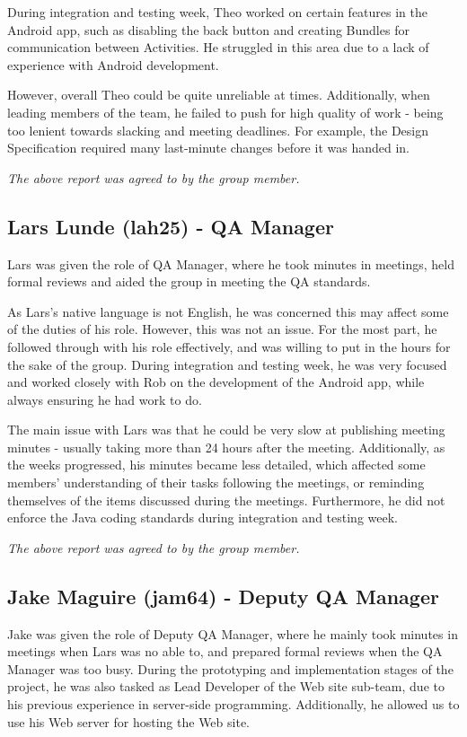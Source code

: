 \documentclass{project}
\begin{document}
During integration and testing week, Theo worked on certain features in the Android app, such as disabling the back button and creating Bundles for communication between Activities. He struggled in this area due to a lack of experience with Android development.

However, overall Theo could be quite unreliable at times. Additionally, when leading members of the team, he failed to push for high quality of work - being too lenient towards slacking and meeting deadlines. For example, the Design Specification required many last-minute changes before it was handed in.

\emph{The above report was agreed to by the group member.}


\newpage


\subsection{Lars Lunde (lah25) - QA Manager}
Lars was given the role of QA Manager, where he took minutes in meetings, held formal reviews and aided the group in meeting the QA standards.

As Lars's native language is not English, he was concerned this may affect some of the duties of his role. However, this was not an issue. For the most part, he followed through with his role effectively, and was willing to put in the hours for the sake of the group. During integration and testing week, he was very focused and worked closely with Rob on the development of the Android app, while always ensuring he had work to do.

The main issue with Lars was that he could be very slow at publishing meeting minutes - usually taking more than 24 hours after the meeting. Additionally, as the weeks progressed, his minutes became less detailed, which affected some members’ understanding of their tasks following the meetings, or reminding themselves of the items discussed during the meetings. Furthermore, he did not enforce the Java coding standards during integration and testing week.

\emph{The above report was agreed to by the group member.}


\subsection{Jake Maguire (jam64) - Deputy QA Manager}
Jake was given the role of Deputy QA Manager, where he mainly took minutes in meetings when Lars was no able to, and prepared formal reviews when the QA Manager was too busy. During the prototyping and implementation stages of the project, he was also tasked as Lead Developer of the Web site sub-team, due to his previous experience in server-side programming. Additionally, he allowed us to use his Web server for hosting the Web site.
\end{document}
